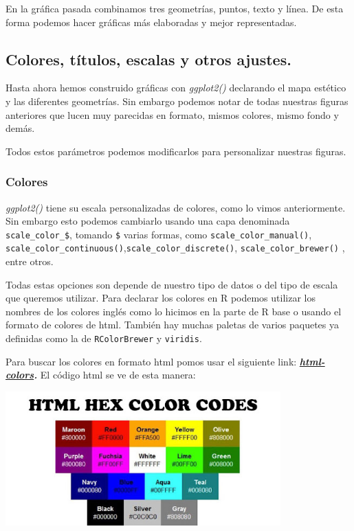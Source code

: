 \documentclass[
]{book}
\begin{document}
En la gráfica pasada combinamos tres geometrías, puntos, texto y línea.
De esta forma podemos hacer gráficas más elaboradas y mejor representadas.

\subsection{Colores, títulos, escalas y otros ajustes.}\label{colores-tuxedtulos-escalas-y-otros-ajustes.}

\hfill\break
Hasta ahora hemos construido gráficas con \emph{ggplot2()} declarando el mapa estético y las diferentes geometrías.
Sin embargo podemos notar de todas nuestras figuras anteriores que lucen muy parecidas en formato, mismos colores, mismo fondo y demás.

Todos estos parámetros podemos modificarlos para personalizar nuestras figuras.

\subsubsection{Colores}\label{colores}

\emph{ggplot2()} tiene su escala personalizadas de colores, como lo vimos anteriormente.
Sin embargo esto podemos cambiarlo usando una capa denominada \texttt{scale\_color\_\$}, tomando \texttt{\$} varias formas, como \texttt{scale\_color\_manual()}, \texttt{scale\_color\_continuous()},\texttt{scale\_color\_discrete()}, \texttt{scale\_color\_brewer()} , entre otros.

Todas estas opciones son depende de nuestro tipo de datos o del tipo de escala que queremos utilizar.
Para declarar los colores en R podemos utilizar los nombres de los colores inglés como lo hicimos en la parte de R base o usando el formato de colores de html.
También hay muchas paletas de varios paquetes ya definidas como la de \texttt{RColorBrewer} y \texttt{viridis}.

Para buscar los colores en formato html pomos usar el siguiente link: \href{https://htmlcolorcodes.com/es/}{\textbf{\emph{html-colors}}}\textbf{\emph{.}} El código html se ve de esta manera:\\

\begin{center}\includegraphics[width=300pt]{images//colors} \end{center}
\end{document}
